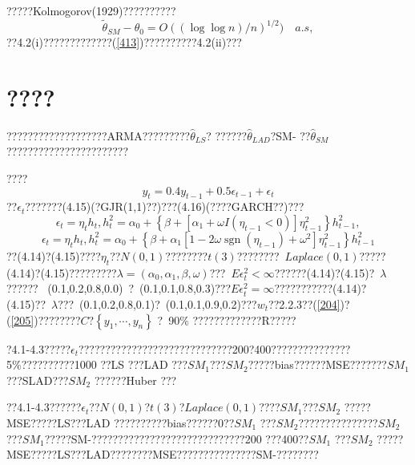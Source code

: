 \documentclass[a4paper,12pt,openany,oneside,utf-8]{ctexbook}
\begin{document}
	\noindent ?????Kolmogorov(1929)??????????
	$$\tilde{\theta}_{SM}-\theta_{0}=O((\log \log n) / n)^{1 / 2} ) \quad a.s ,$$
	\noindent ??4.2(i)?????????????(\ref{413})??????????4.2(ii)???
	
	\section{????}
	
	???????????????????ARMA?????????$\hat{\theta}_{LS}$? ??????$\hat{\theta}_{LAD}$?SM- ??$\hat{\theta}_{SM}$ ???????????????????????
	
	????
	\begin{equation}\label{414}
		y_{t}=0.4 y_{t-1}+0.5 \epsilon_{t-1}+\epsilon_{t}
	\end{equation}
	??$\epsilon_t$???????(4.15)(?GJR(1,1)??)???(4.16)(????GARCH??)???
	\begin{equation}\label{415}
		\epsilon_{t}=\eta_{t} h_{t}, h_{t}^{2}=\alpha_{0}+\left\{\beta+\left[\alpha_{1}+\omega I\left(\eta_{t-1}<0\right)\right] \eta_{t-1}^{2}\right\} h_{t-1}^{2},
	\end{equation}
	\begin{equation}\label{416}
		\epsilon_{t}=\eta_{t} h_{t}, h_{t}^{2}=\alpha_{0}+\left\{\beta+\alpha_{1}\left[1-2 \omega \operatorname{sgn}\left(\eta_{t-1}\right)+\omega^{2}\right] \eta_{t-1}^{2}\right\} h_{t-1}^{2}
	\end{equation}
	??(4.14)?(4.15)????$\eta_t$??$N(0,1)$????????$t(3)$????????~$Laplace(0,1)$?????(4.14)?(4.15)?????????$\lambda=\left(\alpha_{0}, \alpha_{1}, \beta, \omega\right)$???~$E \epsilon_{t}^{2}<\infty$??????(4.14)?(4.15)?~$\lambda$?????? ~(0.1,0.2,0.8,0.0)~?~(0.1,0.1,0.8,0.3)???$E \epsilon_{t}^{2}=\infty$???????????(4.14)?(4.15)??~$\lambda$???~(0.1,0.2,0.8,0.1)?~(0.1,0.1,0.9,0.2)???$w_t$??2.2.3??(\ref{204})?(\ref{205})????????$C$?$\left\{y_1,\cdots,y_n\right\}$ ?~90\% ?????????????R?????
	
	?4.1-4.3?????$\epsilon_t$?????????????????????????????200?400???????????????5\%??????????1000 ??LS ???LAD ???$SM_1$???$SM_2$?????bias??????MSE???????$SM_1$???SLAD???$SM_2$ ??????Huber ???
	
	??4.1-4.3??????$\epsilon_t$??$N(0,1)$?$t(3)$?$Laplace(0,1)$????$SM_1$???$SM_2$ ?????MSE?????LS???LAD ??????????bias??????0??$SM_1$ ???$SM_2$???????????????$SM_2$???$SM_1$?????SM-?????????????????????????????200 ???400??$SM_1$ ???$SM_2$ ?????MSE?????LS???LAD????????MSE???????????????SM-????????
	
\end{document}
